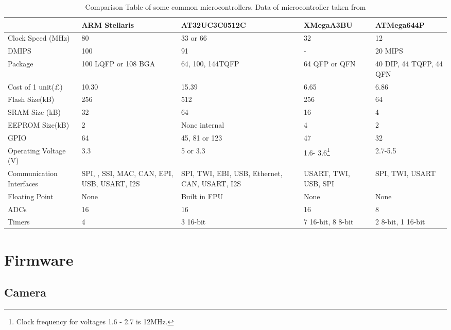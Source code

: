 \begin{table}
\centering
\begin{tabular}{|p{3.5cm}|p{2.4cm}|p{2.9cm}|p{2.3cm}|p{2.4cm}|}\hline
						& 	ARM Stellaris		&	AT32UC3C0512C 		&	XMegaA3BU	&	ATMega644P 	\\	\hline
Clock Speed	(MHz)		&	80					&	33 or 66			&	32			&	12			\\
DMIPS					&	100					&	91					&	-			&	20 MIPS		\\
Package					&	100 LQFP or 108 BGA	&	64, 100, 144TQFP	&	64 QFP or QFN & 40 DIP, 44 TQFP, 44 QFN \\
Cost of 1 unit(\pounds)	&	10.30				& 15.39 &	6.65	 & 6.86\\
Flash Size(kB)			&	256					&	512					&	256			&	64 \\
SRAM Size (kB)			&	32					&	64					&	16			&	4	\\
EEPROM Size(kB)			&	2					&	None internal		&	4			&	2 	\\
GPIO					&	64					& 	45, 81 or 123		&	47			& 	32	\\
Operating Voltage (V)	&	3.3					& 	5	or 3.3			& 	1.6- 3.6\footnote{Clock frequency for voltages 1.6 - 2.7 is 12MHz.}		& 	2.7-5.5	\\
Communication Interfaces &	SPI, \itc, SSI, MAC, CAN, EPI, USB, USART, I2S	& SPI, TWI, EBI, USB, Ethernet, CAN, USART, I2S	&	USART, TWI, USB, SPI 		&	SPI, TWI, USART \\
Floating Point			&	None				&	Built in FPU		&	None		&	None		\\
ADCs					&	16					&	16					&	16			&	8			\\
Timers					&	4					&	3 16-bit			& 7 16-bit, 8 8-bit & 2 8-bit, 1 16-bit \\
\hline
\end{tabular}
\caption{Comparison Table of some common microcontrollers. Data of microcontroller taken from }
\label{tab:uCComp}
\end{table}



\section{Firmware}
\subsection{Camera}

